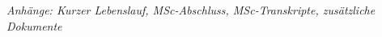 \documentclass[a4paper]{article}
\author{Ali Darijani}
\date{\today}{I}
\begin{document}
\maketitle
%
%

\par
\dotline
\vspace{\baselineskip}
\textit{Anhänge: Kurzer Lebenslauf, MSc-Abschluss, MSc-Transkripte, zusätzliche Dokumente}
\par
%

%
% 
%
%
\end{document}
